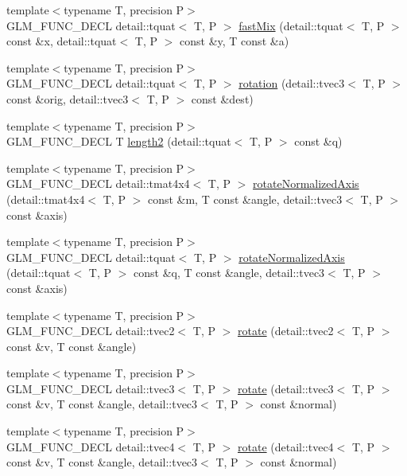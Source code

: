 \begin{CompactItemize}
{\footnotesize template$<$typename T, precision P$>$ }\\GLM\_\-FUNC\_\-DECL detail::tquat$<$ T, P $>$ \hyperlink{group__gtx__quaternion_g0538872e0a23bc7ba865700756c1a3a7}{fastMix} (detail::tquat$<$ T, P $>$ const \&x, detail::tquat$<$ T, P $>$ const \&y, T const \&a)
\item 
{\footnotesize template$<$typename T, precision P$>$ }\\GLM\_\-FUNC\_\-DECL detail::tquat$<$ T, P $>$ \hyperlink{group__gtx__quaternion_gf7a15242ef69e5c997df231b28b92cef}{rotation} (detail::tvec3$<$ T, P $>$ const \&orig, detail::tvec3$<$ T, P $>$ const \&dest)
\item 
{\footnotesize template$<$typename T, precision P$>$ }\\GLM\_\-FUNC\_\-DECL T \hyperlink{group__gtx__quaternion_ge0ff959e757f5feba0bd375658673d0d}{length2} (detail::tquat$<$ T, P $>$ const \&q)
\item 
{\footnotesize template$<$typename T, precision P$>$ }\\GLM\_\-FUNC\_\-DECL detail::tmat4x4$<$ T, P $>$ \hyperlink{group__gtx__rotate__normalized__axis_g9fc93bb16dd6719fc660a506cb833fb0}{rotateNormalizedAxis} (detail::tmat4x4$<$ T, P $>$ const \&m, T const \&angle, detail::tvec3$<$ T, P $>$ const \&axis)
\item 
{\footnotesize template$<$typename T, precision P$>$ }\\GLM\_\-FUNC\_\-DECL detail::tquat$<$ T, P $>$ \hyperlink{group__gtx__rotate__normalized__axis_g34cc3bc3287bc3f56bac3c3a70cea353}{rotateNormalizedAxis} (detail::tquat$<$ T, P $>$ const \&q, T const \&angle, detail::tvec3$<$ T, P $>$ const \&axis)
\item 
{\footnotesize template$<$typename T, precision P$>$ }\\GLM\_\-FUNC\_\-DECL detail::tvec2$<$ T, P $>$ \hyperlink{group__gtx__rotate__vector_gc1ec422e7ac679e3332b381e88d29dfd}{rotate} (detail::tvec2$<$ T, P $>$ const \&v, T const \&angle)
\item 
{\footnotesize template$<$typename T, precision P$>$ }\\GLM\_\-FUNC\_\-DECL detail::tvec3$<$ T, P $>$ \hyperlink{group__gtx__rotate__vector_gf0809ae83e84fc9880b4c8b7093c349c}{rotate} (detail::tvec3$<$ T, P $>$ const \&v, T const \&angle, detail::tvec3$<$ T, P $>$ const \&normal)
\item 
{\footnotesize template$<$typename T, precision P$>$ }\\GLM\_\-FUNC\_\-DECL detail::tvec4$<$ T, P $>$ \hyperlink{group__gtx__rotate__vector_ga787e2132208a47efe58640ac7de9509}{rotate} (detail::tvec4$<$ T, P $>$ const \&v, T const \&angle, detail::tvec3$<$ T, P $>$ const \&normal)

\end{CompactItemize}
